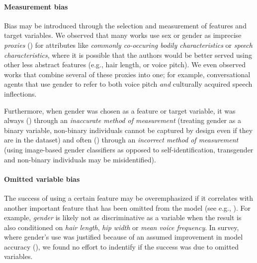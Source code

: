 \documentclass[nonacm,sigconf,review,balance=false]{acmart}
\begin{document}
\paragraph*{Measurement bias} Bias may be introduced through the selection and measurement of features and target variables.
We observed that many works use sex or gender as imprecise \emph{proxies} (\var) for attributes like \emph{commonly co-occuring bodily characteristics} or \emph{speech characteristics}, where it is possible that the authors would be better served using other less abstract features (e.g., hair length, or voice pitch). We even observed works that combine several of these proxies into one; for example,
conversational agents that use gender to refer to both voice pitch \emph{and} culturally acquired speech inflections.

Furthermore, when gender was chosen as a feature or target variable, it was always (\binary) through an \emph{inaccurate method of measurement} (treating gender as a binary variable, non-binary individuals cannot be captured by design even if they are in the dataset) and often (\classifier) through an \emph{incorrect method of measurement} (using image-based gender classifiers as opposed to self-identification, transgender and non-binary individuals may be misidentified).

\paragraph*{Omitted variable bias} The success of using a certain feature may be overemphasized if it correlates with another important feature that has been omitted from the model (see e.g., \cite{clarke2005phantom}). For example, \emph{gender} is likely not as discriminative as a variable when the result is also conditioned on \emph{hair length}, \emph{hip width} or \emph{mean voice frequency}. In survey, where gender's use was justified because of an assumed improvement in model accuracy (\var), we found no effort to indentify if the success was due to omitted variables.
\end{document}
